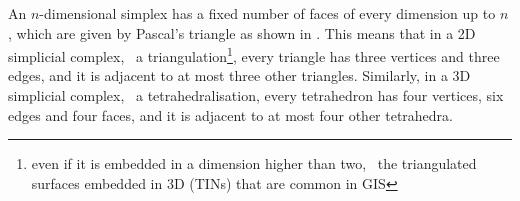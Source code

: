 An $n$-dimensional simplex has a fixed number of faces of every dimension up to $n$, which are given by Pascal's triangle as shown in .
This means that in a 2D simplicial complex, \ie\ a triangulation\footnote{even if it is embedded in a dimension higher than two, \eg\ the triangulated surfaces embedded in 3D (TINs) that are common in GIS}, every triangle has three vertices and three edges, and it is adjacent to at most three other triangles.
Similarly, in a 3D simplicial complex, \ie\ a tetrahedralisation, every tetrahedron has four vertices, six edges and four faces, and it is adjacent to at most four other tetrahedra.

